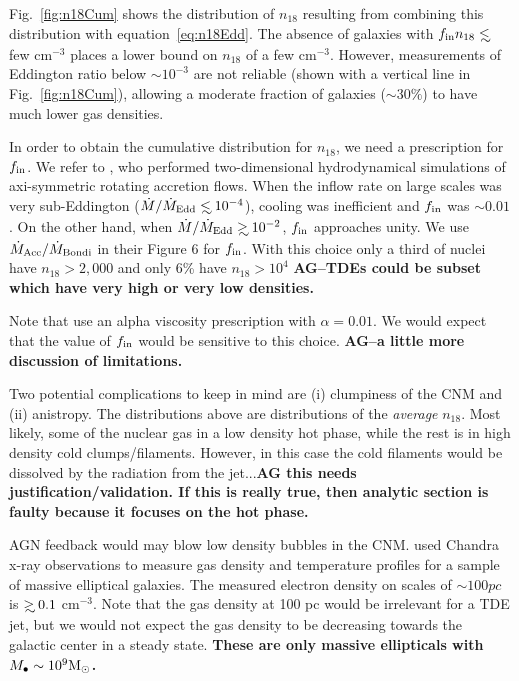 \documentclass[usenatbib,fleqn]{mnras}
\newcommand\lsim{\mathrel{\rlap{\lower4pt\hbox{\hskip1pt$\sim$}}
    \raise1pt\hbox{$<$}}}
\newcommand\gsim{\mathrel{\rlap{\lower4pt\hbox{\hskip1pt$\sim$}}
    \raise1pt\hbox{$>$}}}
\newcommand{\Mbh}[1][]{M_{\bullet#1}}
\newcommand{\Msun}{{\rm M_\odot}}
\begin{document}
Fig.~\ref{fig:n18Cum} shows the distribution of $n_{18}$ resulting
from combining this distribution with equation~\eqref{eq:n18Edd}.  The
absence of galaxies with $f_{\rm in }n_{18} \lsim$ few cm$^{-3}$
places a lower bound on $n_{18}$ of a few cm$^{-3}$.  However,
measurements of Eddington ratio below $\sim 10^{-3}$ are not reliable
(shown with a vertical line in Fig.~\ref{fig:n18Cum}), allowing
a moderate fraction of galaxies ($\sim 30\%$) to have much lower gas
densities.


In order to obtain the cumulative distribution for $n_{18}$, we need a
prescription for $f_{\rm in}$. We refer to \citet{Li+2013}, who
performed two-dimensional hydrodynamical simulations of axi-symmetric
rotating accretion flows. When the inflow rate on large scales was
very sub-Eddington ($\dot{M}/\dot{M}_{\rm Edd} \lsim 10^{-4}$),
cooling was inefficient and $f_{\rm in}$ was $\sim 0.01$. On the other
hand, when $\dot{M}/\dot{M}_{\rm Edd}\gsim 10^{-2}$, $f_{\rm in}$
approaches unity.  We use $\dot{M}_{\rm Acc}/\dot{M}_{\rm Bondi}$ in
their Figure 6 for $f_{\rm in}$.  With this choice only a third of
nuclei have $n_{18}>2,000$ and only 6\% have $n_{18}>10^{4}$ {\bf
  AG--TDEs could be subset which have very high or very low
  densities.}

Note that \citet{Li+2013} use an alpha viscosity prescription with
$\alpha=0.01$. We would expect that the value of $f_{\rm in}$ would be
sensitive to this choice. {\bf AG--a little more discussion of limitations.}

Two potential complications to keep in mind are (i) clumpiness of the
CNM and (ii) anistropy. The distributions above are
distributions of the {\it average} $n_{18}$.  Most likely, some of the
nuclear gas in a low density hot phase, while the rest is in high density
cold clumps/filaments. However, in this case the cold filaments would
be dissolved by the radiation from the jet...{\bf AG this needs
  justification/validation. If this is really true, then analytic
  section is faulty because it focuses on the hot phase.}


AGN feedback would may blow low density bubbles in the
CNM. \citet{Russell+2013} used Chandra x-ray observations to measure gas
density and temperature profiles for a sample of massive elliptical
galaxies. The measured electron density on scales of $\sim 100
pc$ is $\gsim 0.1$ cm$^{-3}$. Note that the gas density at 100 pc
would be irrelevant for a TDE jet, but we would not expect the gas
density to be decreasing towards the galactic center in a steady
state. {\bf These are only massive ellipticals with $\Mbh\sim 10^{9} \Msun$.}
\end{document}
